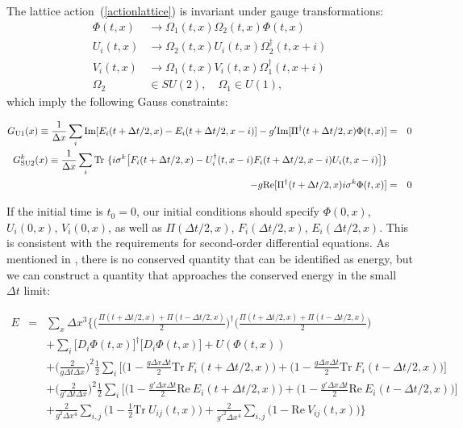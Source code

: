 \documentclass[prd,twocolumn,nofootinbib]{revtex4-1}
\begin{document}
The lattice action~(\ref{actionlattice}) is invariant under 
gauge transformations: 
\begin{align*}
\Phi(t,x) &\rightarrow \Omega_1(t,x) \Omega_2(t,x) \Phi(t,x) \\ 
U_i(t,x) &\rightarrow \Omega_2(t,x) U_i(t,x) \Omega_2^\dagger (t,x+i) \\
V_i(t,x) &\rightarrow \Omega_1(t,x) V_i(t,x) \Omega_1^\dagger (t,x+i) \\
\Omega_2 &\in SU(2), \quad \Omega_1 \in U(1),
\end{align*}
which imply the following Gauss constraints:
\begin{widetext}
\begin{eqnarray}
\label{gauss-u1}
G_{\rm U1} (x) \equiv \frac{1}{\Delta x} \sum_i \text{Im} [E_i(t+\Delta t/2,x) - E_i(t+\Delta t/2,x-i)] - g' \text{Im} [\Pi^\dagger(t+\Delta t/2,x)\Phi(t,x)]&=&0 \\ 
\label{gauss-su2} \nonumber
	G_{\rm SU2}^k(x) \equiv \frac{1}{\Delta x} \sum_i \text{Tr} ~\{ i\sigma^k \big[F_i (t+\Delta t/2,x)- U_i^\dagger(t,x-i) F_i(t+\Delta t/2,x-i) U_i(t,x-i)\big] \} \\
	- g\text{Re} [\Pi^\dagger(t+\Delta t/2,x)i\sigma^k \Phi(t,x)] &=& 0 
\end{eqnarray}
\end{widetext}
If the initial time is $t_0=0$, our initial conditions should specify 
$\Phi(0,x)$, $U_i(0,x)$, $V_i(0,x)$, as well as $\Pi(\Delta t/2,x)$, 
$F_i(\Delta t/2,x)$, $E_i(\Delta t/2,x)$. This is consistent with the 
requirements for second-order differential equations. As mentioned 
in \cite{moore1996improved}, there is no conserved quantity that can be 
identified as energy, but we can construct a quantity that approaches the 
conserved energy in the small $\Delta t$ limit:
\begin{widetext}
\begin{eqnarray}
\nonumber
E &=& \sum_x \Delta x^3 \Bigg\{ \Big(\frac{\Pi(t+\Delta t/2,x)+\Pi(t-\Delta t/2,x)}{2}\Big)^\dagger \Big(\frac{\Pi(t+\Delta t/2,x)+\Pi(t-\Delta t/2,x)}{2}\Big)  \\ \nonumber
&&+ \sum_i \big[D_i\Phi(t,x) \big]^\dagger \big[D_i\Phi(t,x) \big] +U(\Phi(t,x))  \\ \nonumber
&&+ \Big(\frac{2}{g\Delta t \Delta x}\Big)^2 \frac{1}{2}\sum_i \Big[\Big(1-\frac{g\Delta x\Delta t}{2}\text{Tr}~F_i(t+\Delta t/2,x)\Big)+\Big(1-\frac{g\Delta x\Delta t}{2}\text{Tr}~F_i(t-\Delta t/2,x)\Big) \Big] \\ \nonumber
&&+\Big(\frac{2}{g'\Delta t \Delta x}\Big)^2 \frac{1}{2}\sum_i \Big[\Big(1-\frac{g'\Delta x\Delta t}{2}\text{Re} ~E_i(t+\Delta t/2,x)\Big) + \Big(1-\frac{g'\Delta x\Delta t}{2}\text{Re} ~E_i(t-\Delta t/2,x)\Big)\Big]\\ 
&& +\frac{2}{g^2 \Delta x^4} \sum_{i,j} \Big(1-\frac{1}{2} \text{Tr}~U_{ij}(t,x)\Big)  + \frac{2}{g'^2\Delta x^4} \sum_{i,j} \Big(1-\text{Re}~V_{ij}(t,x)\Big) \Bigg\}
\end{eqnarray}
\end{widetext}
\end{document}
